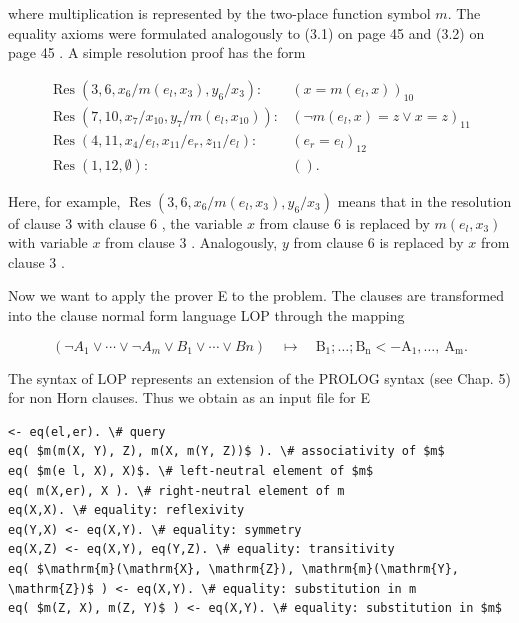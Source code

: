 \documentclass[10pt]{article}
\begin{document}
where multiplication is represented by the two-place function symbol $m$. The equality axioms were formulated analogously to (3.1) on page 45 and (3.2) on page 45 . A simple resolution proof has the form

$$
\begin{array}{ll}
\operatorname{Res}\left(3,6, x_{6} / m\left(e_{l}, x_{3}\right), y_{6} / x_{3}\right): & \left(x=m\left(e_{l}, x\right)\right)_{10} \\
\operatorname{Res}\left(7,10, x_{7} / x_{10}, y_{7} / m\left(e_{l}, x_{10}\right)\right): & \left(\neg m\left(e_{l}, x\right)=z \vee x=z\right)_{11} \\
\operatorname{Res}\left(4,11, x_{4} / e_{l}, x_{11} / e_{r}, z_{11} / e_{l}\right): & \left(e_{r}=e_{l}\right)_{12} \\
\operatorname{Res}(1,12, \emptyset): & () .
\end{array}
$$

Here, for example, $\operatorname{Res}\left(3,6, x_{6} / m\left(e_{l}, x_{3}\right), y_{6} / x_{3}\right)$ means that in the resolution of clause 3 with clause 6 , the variable $x$ from clause 6 is replaced by $m\left(e_{l}, x_{3}\right)$ with variable $x$ from clause 3 . Analogously, $y$ from clause 6 is replaced by $x$ from clause 3 .

Now we want to apply the prover E to the problem. The clauses are transformed into the clause normal form language LOP through the mapping

$$
\left(\neg A_{1} \vee \cdots \vee \neg A_{m} \vee B_{1} \vee \cdots \vee B n\right) \quad \mapsto \quad \mathrm{B}_{1} ; \ldots ; \mathrm{B}_{\mathrm{n}}<-\mathrm{A}_{1}, \ldots, \mathrm{~A}_{\mathrm{m}} .
$$

The syntax of LOP represents an extension of the PROLOG syntax (see Chap. 5) for non Horn clauses. Thus we obtain as an input file for E

\begin{verbatim}
<- eq(el,er). \# query
eq( $m(m(X, Y), Z), m(X, m(Y, Z))$ ). \# associativity of $m$
eq( $m(e l, X), X)$. \# left-neutral element of $m$
eq( m(X,er), X ). \# right-neutral element of m
eq(X,X). \# equality: reflexivity
eq(Y,X) <- eq(X,Y). \# equality: symmetry
eq(X,Z) <- eq(X,Y), eq(Y,Z). \# equality: transitivity
eq( $\mathrm{m}(\mathrm{X}, \mathrm{Z}), \mathrm{m}(\mathrm{Y}, \mathrm{Z})$ ) <- eq(X,Y). \# equality: substitution in m
eq( $m(Z, X), m(Z, Y)$ ) <- eq(X,Y). \# equality: substitution in $m$
\end{verbatim}
\end{document}
